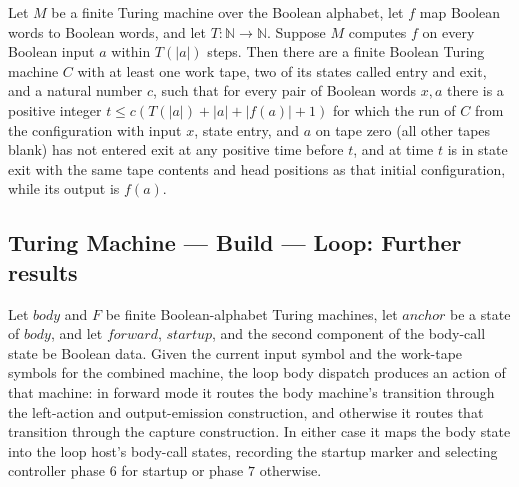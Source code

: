 \begin{theorem}
\label{Turing.FinTM.exists_emitCallTM}
\leanok
{}
Let $M$ be a finite Turing machine over the Boolean alphabet, let $f$ map Boolean words
to Boolean words, and let $T:\mathbb{N}\to\mathbb{N}$. Suppose $M$ computes $f$ on every
Boolean input $a$ within $T(|a|)$ steps. Then there are a finite Boolean Turing machine
$C$ with at least one work tape, two of its states called entry and exit, and a natural
number $c$, such that for every pair of Boolean words $x,a$ there is a positive integer
$t\le c(T(|a|)+|a|+|f(a)|+1)$ for which the run of $C$ from the configuration with input
$x$, state entry, and $a$ on tape zero (all other tapes blank) has not entered exit at
any positive time before $t$, and at time $t$ is in state exit with the same tape
contents and head positions as that initial configuration, while its output is $f(a)$.
\end{theorem}

\subsection*{Turing Machine --- Build --- Loop: Further results}

\begin{definition}
\label{Turing.FinTM.loopBodyDispatch}
\leanok
{}
Let $body$ and $F$ be finite Boolean-alphabet Turing machines, let $anchor$ be a state
of $body$, and let $forward$, $startup$, and the second component of the body-call state
be Boolean data. Given the current input symbol and the work-tape symbols for the
combined machine, the loop body dispatch produces an action of that machine: in forward
mode it routes the body machine's transition through the left-action and output-emission
construction, and otherwise it routes that transition through the capture construction.
In either case it maps the body state into the loop host's body-call states, recording
the startup marker and selecting controller phase $6$ for startup or phase $7$
otherwise.
\end{definition}

